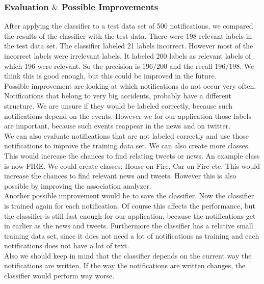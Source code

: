 \subsubsection*{Evaluation $\&$ Possible Improvements }
After applying the classifier to a test data set of 500 notifications, we compared the results of the classifier with the test data. 
There were 198 relevant labels in the test data set. The classifier labeled 21 labels incorrect. 
However most of the incorrect labels were irrelevant labels. 
It labeled 200 labels as relevant labels of which 196 were relevant. 
So the precision is $196/200$ and the recall $196/198$. 
We think this is good enough, but this could be improved in the future. \\
Possible improvement are looking at which notifications do not occur very often. 
Notifications that belong to very big accidents, probably have a different structure. 
We are unsure if they would be labeled correctly, because such notifications depend on the events. 
However we for our application those labels are important, because such events reappear in the news and on twitter. \\
We can also evaluate notifications that are not labeled correctly and use those notifications to improve the training data set. 
We can also create more classes. This would increase the chances to find relating tweets or news. An example class is now FIRE.
We could create classes: House on Fire, Car on Fire etc. This would increase the chances to find relevant news and tweets. However this is also possible by improving the association analyzer. \\
Another possible improvement would be to save the classifier. Now the classifier is trained again for each notification. 
Of course this affects the performance, but the classifier is still fast enough for our application, because the notifications get in earlier as the news and tweets. 
Furthermore the classifier has a relative small training data set, since it does not need a lot of notifications as training and each notifications does not have a lot of text.\\
Also we should keep in mind that the classifier depends on the current way the notifications are written. 
If the way the notifications are written changes, the classifier would perform way worse.
